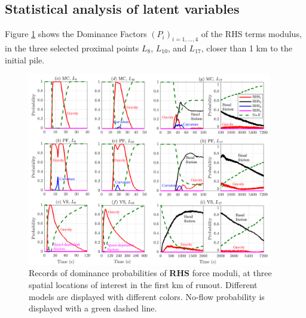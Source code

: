 \documentclass{article}
\begin{document}
\subsection{Statistical analysis of latent variables}\label{Hq2}
Figure \ref{fig:Colima-Pr1} shows the Dominance Factors $(P_i)_{i=1,\dots,4}$ of the RHS terms modulus, in the three selected proximal points $L_{8}$, $L_{10}$, and $L_{17}$, closer than 1 km to the initial pile.
\begin{figure}[H]
         \centering
        \includegraphics[width=0.95\textwidth]{BAF_VolcanDeColima/ForceContrib/Pr1_total.png}
        \caption{Records of dominance probabilities of \textbf{RHS} force moduli, at three spatial locations of interest in the first km of runout. Different models are displayed with different colors. No-flow probability is displayed with a green dashed line.}
        \label{fig:Colima-Pr1}
\end{figure}
\end{document}
